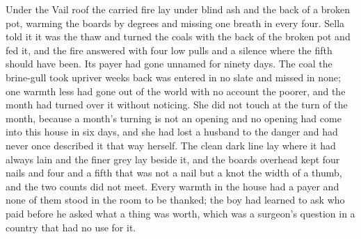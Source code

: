 Under the Vail roof the carried fire lay under blind ash and the back of a broken pot, warming the boards by degrees and missing one breath in every four. Sella told it it was the thaw and turned the coals with the back of the broken pot and fed it, and the fire answered with four low pulls and a silence where the fifth should have been. Its payer had gone unnamed for ninety days. The coal the brine-gull took upriver weeks back was entered in no slate and missed in none; one warmth less had gone out of the world with no account the poorer, and the month had turned over it without noticing. She did not touch  at the turn of the month, because a month's turning is not an opening and no opening had come into this house in six days, and she had lost a husband to the danger and had never once described it that way herself. The clean dark line lay where it had always lain and the finer grey lay beside it, and the boards overhead kept four nails and four and a fifth that was not a nail but a knot the width of a thumb, and the two counts did not meet. Every warmth in the house had a payer and none of them stood in the room to be thanked; the boy had learned to ask who paid before he asked what a thing was worth, which was a surgeon's question in a country that had no use for it.

